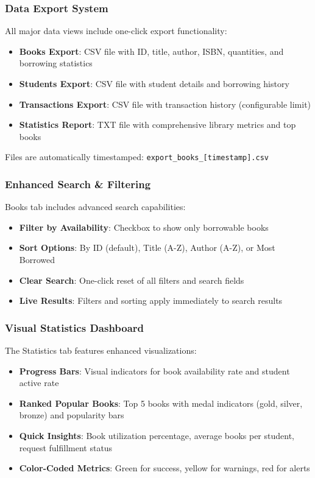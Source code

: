 \documentclass[11pt,a4paper]{article}
\begin{document}
\subsubsection{Data Export System}
All major data views include one-click export functionality:
\begin{itemize}
  \item \textbf{Books Export}: CSV file with ID, title, author, ISBN, quantities, and borrowing statistics
  \item \textbf{Students Export}: CSV file with student details and borrowing history
  \item \textbf{Transactions Export}: CSV file with transaction history (configurable limit)
  \item \textbf{Statistics Report}: TXT file with comprehensive library metrics and top books
\end{itemize}
Files are automatically timestamped: \texttt{export\_books\_[timestamp].csv}

\subsubsection{Enhanced Search \& Filtering}
Books tab includes advanced search capabilities:
\begin{itemize}
  \item \textbf{Filter by Availability}: Checkbox to show only borrowable books
  \item \textbf{Sort Options}: By ID (default), Title (A-Z), Author (A-Z), or Most Borrowed
  \item \textbf{Clear Search}: One-click reset of all filters and search fields
  \item \textbf{Live Results}: Filters and sorting apply immediately to search results
\end{itemize}

\subsubsection{Visual Statistics Dashboard}
The Statistics tab features enhanced visualizations:
\begin{itemize}
  \item \textbf{Progress Bars}: Visual indicators for book availability rate and student active rate
  \item \textbf{Ranked Popular Books}: Top 5 books with medal indicators (gold, silver, bronze) and popularity bars
  \item \textbf{Quick Insights}: Book utilization percentage, average books per student, request fulfillment status
  \item \textbf{Color-Coded Metrics}: Green for success, yellow for warnings, red for alerts
\end{itemize}
\end{document}
